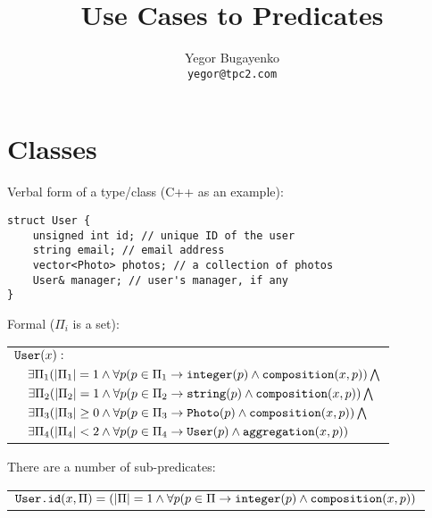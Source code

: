 \documentclass{article}
\begin{document}
\setlength{\parindent}{0pt}
\setlength{\parskip}{1em}
\newcommand{\type}[1]{\mbox{\texttt{#1}}}
\newenvironment{maths}
{
    \vspace*{1em}
    \begin{tabular}{l}
}
{
    \end{tabular}
    \vspace*{1em}
}

\title{Use Cases to Predicates}
\author{Yegor Bugayenko\\\texttt{yegor@tpc2.com}}
\maketitle

\newpage
\section{Classes}

    Verbal form of a type/class (C++ as an example):

    \begin{verbatim}
struct User {
    unsigned int id; // unique ID of the user
    string email; // email address
    vector<Photo> photos; // a collection of photos
    User& manager; // user's manager, if any
}\end{verbatim}

    Formal ($\Pi_i$ is a set):
    
    \begin{maths}
    $\type{User}(x) :$ \\
    $\quad \exists \Pi_1 (|\Pi_1| = 1 \wedge \forall p(p \in \Pi_1 \to \type{integer}(p) \wedge \type{composition}(x, p)) \bigwedge$ \\
    $\quad \exists \Pi_2 (|\Pi_2| = 1 \wedge \forall p(p \in \Pi_2 \to \type{string}(p) \wedge \type{composition}(x, p)) \bigwedge$ \\
    $\quad \exists \Pi_3 (|\Pi_3| \geq 0 \wedge \forall p(p \in \Pi_3 \to \type{Photo}(p) \wedge \type{composition}(x, p)) \bigwedge$ \\
    $\quad \exists \Pi_4 (|\Pi_4| < 2 \wedge \forall p(p \in \Pi_4 \to \type{User}(p) \wedge \type{aggregation}(x, p))$ \\
    \end{maths}
    
    There are a number of sub-predicates:

    \begin{maths}
    $\type{User.id}(x, \Pi) = (|\Pi| = 1 \wedge \forall p(p \in \Pi \to \type{integer}(p) \wedge \type{composition}(x, p))$ \\
    \end{maths}
    
\end{document}
